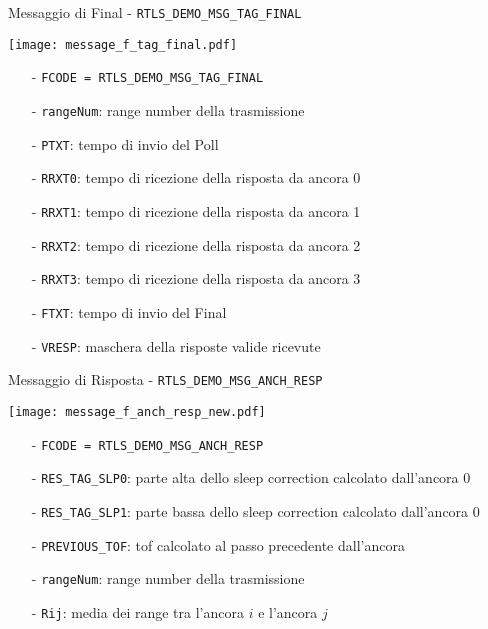 \begin{frame}{Messaggio di Final - \lstinline!RTLS_DEMO_MSG_TAG_FINAL!}
  \begin{center}
    \texttt{[image: message\_f\_tag\_final.pdf]}
  \end{center}
  \begin{itemize}
  \item[-] \lstinline!FCODE = RTLS_DEMO_MSG_TAG_FINAL!
  \item[-] \lstinline!rangeNum!: range number della trasmissione
  \item[-] \lstinline!PTXT!: tempo di invio del Poll
  \item[-] \lstinline!RRXT0!: tempo di ricezione della risposta da ancora 0
  \item[-] \lstinline!RRXT1!: tempo di ricezione della risposta da ancora 1
  \item[-] \lstinline!RRXT2!: tempo di ricezione della risposta da ancora 2
  \item[-] \lstinline!RRXT3!: tempo di ricezione della risposta da ancora 3
  \item[-] \lstinline!FTXT!: tempo di invio del Final
  \item[-] \lstinline!VRESP!: maschera della risposte valide ricevute
  \end{itemize}
\end{frame}

\begin{frame}{Messaggio di Risposta - \lstinline!RTLS_DEMO_MSG_ANCH_RESP!}
  \begin{center}
    \texttt{[image: message\_f\_anch\_resp\_new.pdf]}
  \end{center}
  \begin{itemize}
  \item[-] \lstinline!FCODE = RTLS_DEMO_MSG_ANCH_RESP!
  \item[-] \lstinline!RES_TAG_SLP0!: parte alta dello sleep correction calcolato dall'ancora 0
  \item[-] \lstinline!RES_TAG_SLP1!: parte bassa dello sleep correction calcolato dall'ancora 0
  \item[-] \lstinline!PREVIOUS_TOF!: tof calcolato al passo precedente dall'ancora
  \item[-] \lstinline!rangeNum!: range number della trasmissione
  \item[-] \lstinline!Rij!: media dei range tra l'ancora $i$ e l'ancora $j$
  \end{itemize}
\end{frame}

